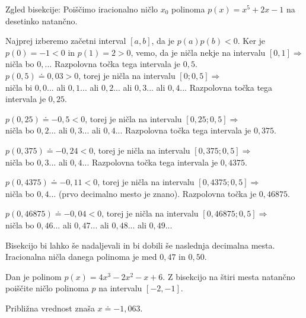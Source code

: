 


\begin{vaja}

Zgled bisekcije:
Poiščimo iracionalno ničlo $x_0$ polinoma $p(x)=x^5+2x-1$ na desetinko natančno.

Najprej izberemo začetni interval $[a,b]$, da je $p(a)p(b)<0$. Ker je $p(0)=-1<0$ in $p(1)=2>0$, 
vemo, da je ničla nekje na intervalu $[0,1] \Rightarrow$ \\
ničla bo $0,...$ Razpolovna točka tega intervala je $0,5$. \\
$p(0,5)\doteq 0,03>0$, torej je ničla na intervalu $[0;0,5] \Rightarrow$ \\

ničla bi $0,0...$ ali $0,1...$ ali $0,2...$ ali $0,3...$ ali $0,4...$ Razpolovna točka tega intervala je $0,25$.

$p(0,25)\doteq-0,5<0$, torej je ničla na intervalu $[0,25;0,5] \Rightarrow$ \\
ničla bo $0,2...$ ali $0,3...$ ali $0,4...$ Razpolovna točka tega intervala je $0,375$.

$p(0,375)\doteq -0,24<0$, torej je ničla na intervalu $[0,375;0,5] \Rightarrow$ \\
ničla bo $0,3...$ ali $0,4...$ Razpolovna točka tega intervala je $0,4375$.

$p(0,4375)\doteq -0,11<0$, torej je ničla na intervalu $[0,4375;0,5] \Rightarrow$ \\
ničla bo $0,4...$ (prvo decimalno mesto je znano). Razpolovna točka je $0,46875$.

$p(0,46875)\doteq -0,04<0$, torej je ničla na intervalu $[0,46875;0,5] \Rightarrow$ \\
ničla bo $0,46...$ ali $0,47...$ ali $0,48...$ ali $0,49$...

Bisekcijo bi lahko še nadaljevali in bi dobili še naslednja decimalna mesta.
Iracionalna ničla danega polinoma je med $0,47$ in $0,50$.



\end{vaja}

\begin{vaja}
Dan je polinom $p(x)=4x^3-2x^2-x+6$. Z bisekcijo na štiri mesta natančno poiščite ničlo
polinoma $p$ na intervalu $[-2,-1]$.


\begin{odgovor}
Približna vrednost znaša $x\doteq -1,063$.
\end{odgovor}

\end{vaja}




